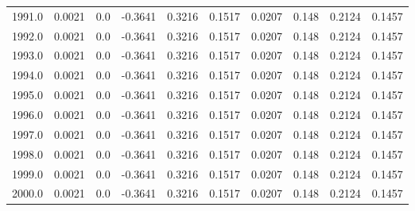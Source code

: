 \begin{longtable}{lrrrrrrrrr}
1991.0 & 0.0021 & 0.0 & -0.3641 & 0.3216 & 0.1517 & 0.0207 & 0.148 & 0.2124 & 0.1457 \\
1992.0 & 0.0021 & 0.0 & -0.3641 & 0.3216 & 0.1517 & 0.0207 & 0.148 & 0.2124 & 0.1457 \\
1993.0 & 0.0021 & 0.0 & -0.3641 & 0.3216 & 0.1517 & 0.0207 & 0.148 & 0.2124 & 0.1457 \\
1994.0 & 0.0021 & 0.0 & -0.3641 & 0.3216 & 0.1517 & 0.0207 & 0.148 & 0.2124 & 0.1457 \\
1995.0 & 0.0021 & 0.0 & -0.3641 & 0.3216 & 0.1517 & 0.0207 & 0.148 & 0.2124 & 0.1457 \\
1996.0 & 0.0021 & 0.0 & -0.3641 & 0.3216 & 0.1517 & 0.0207 & 0.148 & 0.2124 & 0.1457 \\
1997.0 & 0.0021 & 0.0 & -0.3641 & 0.3216 & 0.1517 & 0.0207 & 0.148 & 0.2124 & 0.1457 \\
1998.0 & 0.0021 & 0.0 & -0.3641 & 0.3216 & 0.1517 & 0.0207 & 0.148 & 0.2124 & 0.1457 \\
1999.0 & 0.0021 & 0.0 & -0.3641 & 0.3216 & 0.1517 & 0.0207 & 0.148 & 0.2124 & 0.1457 \\
2000.0 & 0.0021 & 0.0 & -0.3641 & 0.3216 & 0.1517 & 0.0207 & 0.148 & 0.2124 & 0.1457 \\
\end{longtable}